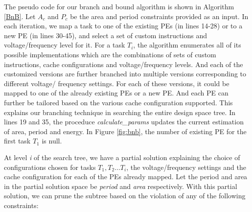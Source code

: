 The pseudo code for our branch and bound algorithm is shown in Algorithm
\ref{BnB}. Let $A_c$ and $P_c$ be the area and period constraints
provided as an input.
In each iteration, we map a task to one of the existing PEs (in lines
14-28) or to a new PE (in lines 30-45), and select a set of custom
instructions and voltage/frequency level for it. For a task $T_i$, the
algorithm enumerates all of its possible implementations which are the
combinations of sets of custom instructions, cache configurations and
voltage/frequency levels. And each of the customized versions are further
branched into multiple versions corresponding to different voltage/
frequency settings. For each of these versions, it could be mapped to
one of the already existing PEs or a new PE. And each PE can further
be tailored based on the various cache configuration supported. This
explains our branching technique in searching the entire design space
tree. In lines 19 and 35, the proceduce \textit{calculate\_params}
updates the current estimation of area, period and energy. In Figure
\ref{fig:bnb}, the number of existing PE for the first task $T_1$ is
null.

At level \textit{i} of the search tree, we have a partial solution
explaining the choice of configurations chosen for tasks $T_1,
T_2...T_i$, the voltage/frequency settings and the cache configuration
for each of the PEs already mapped. Let the period and area in the
partial solution space be \textit{period} and \textit{area} respectively.
With this partial solution, we can prune the subtree based on the
violation of any of the following constraints:

